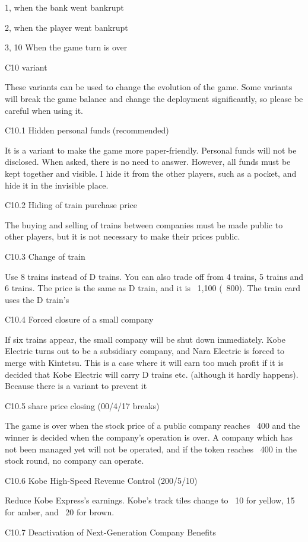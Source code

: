\documentclass{article}
\begin{document}
\begin{CJK}{UTF8}{min}
1, when the bank went bankrupt

2, when the player went bankrupt

3, 10 When the game turn is over

C10 variant

These variants can be used to change the evolution of the game. Some variants will break the game balance and change the deployment significantly, so please be careful when using it.

C10.1 Hidden personal funds (recommended)

It is a variant to make the game more paper-friendly. Personal funds will not be disclosed. When asked, there is no need to answer. However, all funds must be kept together and visible. I hide it from the other players, such as a pocket, and hide it in the invisible place.

C10.2 Hiding of train purchase price

The buying and selling of trains between companies must be made public to other players, but it is not necessary to make their prices public.

C10.3 Change of train

Use 8 trains instead of D trains. You can also trade off from 4 trains, 5 trains and 6 trains. The price is the same as D train, and it is \ 1,100 (\ 800). The train card uses the D train's

C10.4 Forced closure of a small company

If six trains appear, the small company will be shut down immediately. Kobe Electric turns out to be a subsidiary company, and Nara Electric is forced to merge with Kintetsu. This is a case where it will earn too much profit if it is decided that Kobe Electric will carry D trains etc. (although it hardly happens). Because there is a variant to prevent it

C10.5 share price closing (00/4/17 breaks)

The game is over when the stock price of a public company reaches \ 400 and the winner is decided when the company's operation is over. A company which has not been managed yet will not be operated, and if the token reaches \ 400 in the stock round, no company can operate.

C10.6 Kobe High-Speed ​​Revenue Control (200/5/10)

Reduce Kobe Express's earnings. Kobe's track tiles change to \ 10 for yellow, 15 for amber, and \ 20 for brown.

C10.7 Deactivation of Next-Generation Company Benefits


\end{CJK}
\end{document}
